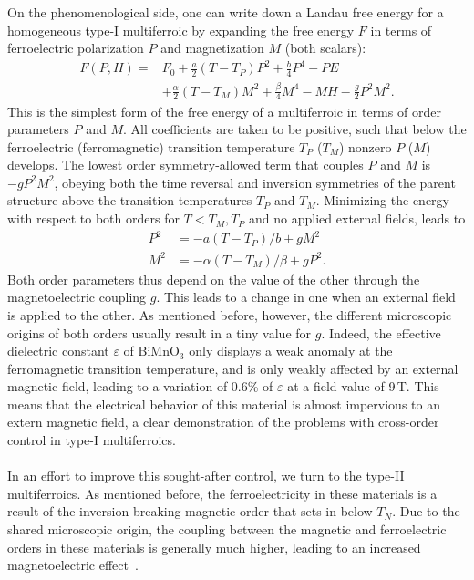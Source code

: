 \\\\
On the phenomenological side, one can write down a Landau free energy for a homogeneous type-I multiferroic by expanding the free energy $F$ in terms of ferroelectric polarization $P$ and magnetization $M$ (both scalars):
\begin{align}
	F(P, H) =& F_0 + \frac{a}{2} (T-T_P) P^2 + \frac{b}{4} P^4 - P E \\
	&+\frac{\alpha}{2} (T-T_M)M^2 + \frac{\beta}{4} M^4 - MH - \frac{g}{2}P^2 M^2.
\end{align}
This is the simplest form of the free energy of a multiferroic in terms of order parameters $P$ and $M$.
All coefficients are taken to be positive, such that below the ferroelectric (ferromagnetic) transition temperature $T_P$ ($T_M$) nonzero $P$ ($M$) develops.
The lowest order symmetry-allowed term that couples $P$ and $M$ is $-gP^2M^2$, obeying both the time reversal and inversion symmetries of the parent structure above the transition temperatures $T_P$ and $T_M$.
Minimizing the energy with respect to both orders for $T<T_M,T_P$ and no applied external fields, leads to
\begin{align}
	P^2 &= - a(T-T_P)/b + gM^2\\
	M^2 &= - \alpha(T-T_M)/\beta + gP^2.
\end{align}
Both order parameters thus depend on the value of the other through the magnetoelectric coupling $g$. This leads to a change in one when an external field is applied to the other.
As mentioned before, however, the different microscopic origins of both orders usually result in a tiny value for $g$.
Indeed, the effective dielectric constant $\varepsilon$ of BiMnO$_3$ only displays a weak anomaly at the ferromagnetic transition temperature, and is only weakly affected by an external magnetic field, leading to a variation of 0.6\% of $\varepsilon$ at a field value of 9\,T.
This means that the electrical behavior of this material is almost impervious to an extern magnetic field, a clear demonstration of the problems with cross-order control in type-I multiferroics.
\\\\
In an effort to improve this sought-after control, we turn to the type-II multiferroics.
As mentioned before, the ferroelectricity in these materials is a result of the inversion breaking magnetic order that sets in below $T_N$.
Due to the shared microscopic origin, the coupling between the magnetic and ferroelectric orders in these materials is generally much higher, leading to an increased magnetoelectric effect~\cite{Oh2014}.
